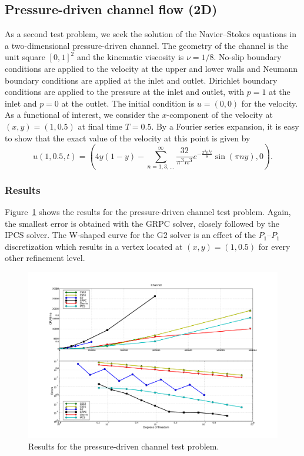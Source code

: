 \subsection{Pressure-driven channel flow (2D)}

As a second test problem, we seek the solution of the Navier--Stokes
equations in a two-dimensional pressure-driven channel. The geometry
of the channel is the unit square $[0, 1]^2$ and the kinematic
viscosity is $\nu = 1/8$. No-slip boundary conditions are applied to
the velocity at the upper and lower walls and Neumann boundary
conditions are applied at the inlet and outlet. Dirichlet boundary
conditions are applied to the pressure at the inlet and outlet, with
$p = 1$ at the inlet and $p = 0$ at the outlet. The initial condition
is $u = (0, 0)$ for the velocity. As a functional of interest, we
consider the $x$-component of the velocity at $(x, y) = (1, 0.5)$ at
final time $T = 0.5$. By a Fourier series expansion, it is easy to
show that the exact value of the velocity at this point is given by
\begin{equation*} \label{eq:exact_channel}
  u(1, 0.5, t) = (4y(1-y) - \sum_{n=1,3,...}^\infty \frac{32}{\pi^3 n^3}
  e^{-\frac{\pi^2 n^2 t}{8}} \sin (\pi n y), 0).
\end{equation*}

\subsubsection{Results}

Figure~\ref{fig:channel_results} shows the results for the
pressure-driven channel test problem. Again, the smallest error is
obtained with the GRPC solver, closely followed by the IPCS solver.
The W-shaped curve for the G2 solver is an effect of the $P_1$--$P_1$
discretization which results in a vertex located at $(x, y) = (1,
0.5)$ for every other refinement level.

\begin{figure}
  \begin{center}
    \includegraphics[width=14cm]{chapters/kvs-1/pdf/new_channel_res.pdf}
    \caption{Results for the pressure-driven channel test problem.}
    \label{fig:channel_results}
  \end{center}
\end{figure}

